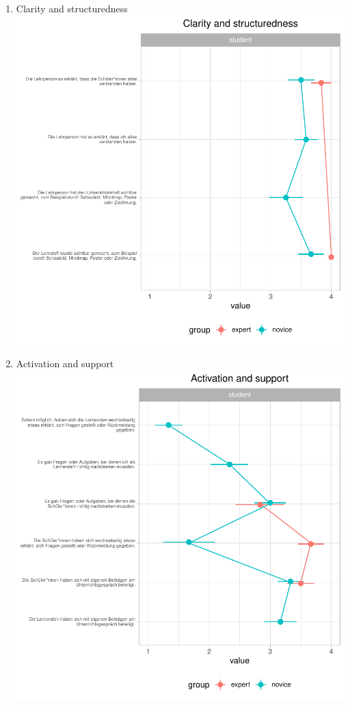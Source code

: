 \documentclass[
  english,
  man,floatsintext]{apa6}
\begin{document}
\begin{enumerate}
  \newpage
\item
  Clarity and structuredness
  \includegraphics{paper_1_supplement_new_table_files/figure-latex/Clarity and structuredness line plots-1.pdf}
  \newpage
\item
  Activation and support
  \includegraphics{paper_1_supplement_new_table_files/figure-latex/Activation and support line plots-1.pdf}
  \newpage
\end{enumerate}
\end{document}
